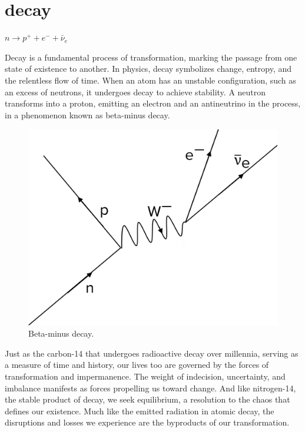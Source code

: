 \chapter*{decay}
\begin{center}
\vspace{2cm}
\begin{flushright}
\large
\textit{ $n \rightarrow p^+ + e^- + \bar{\nu}_e$ }
\end{flushright}
\vspace{2cm}
\end{center}
\normalsize

\newpage  %
Decay is a fundamental process of transformation, marking the passage from one state of existence to another. In physics, decay symbolizes change, entropy, and the relentless flow of time. When an atom has an unstable configuration, such as an excess of neutrons, it undergoes decay to achieve stability. A neutron transforms into a proton, emitting an electron and an antineutrino in the process, in a phenomenon known as beta-minus decay.

\begin{figure}
    \centering
    \includegraphics[width=0.8\linewidth]{assets/betaminusdecay.png} 
    \caption{\small Beta-minus decay.}
    \label{fig:betaminusdecay}
\end{figure}

Just as the carbon-14 that undergoes radioactive decay over millennia, serving as a measure of time and history, our lives too are governed by the forces of transformation and impermanence. The weight of indecision, uncertainty, and imbalance manifests as forces propelling us toward change. And like nitrogen-14, the stable product of decay, we seek equilibrium, a resolution to the chaos that defines our existence. Much like the emitted radiation in atomic decay, the disruptions and losses we experience are the byproducts of our transformation.

